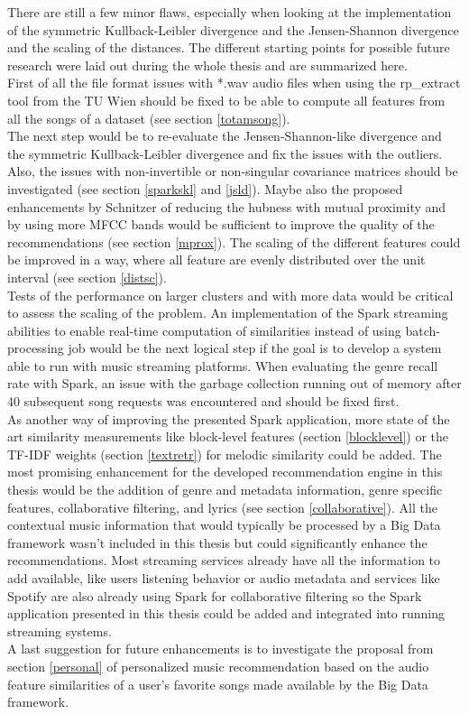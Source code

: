 There are still a few minor flaws, especially when looking at the implementation of the symmetric Kullback-Leibler divergence and the Jensen-Shannon divergence and the scaling of the distances. The different starting points for possible future research were laid out during the whole thesis and are summarized here.\\
First of all the file format issues with *.wav audio files when using the rp\_extract tool from the TU Wien should be fixed to be able to compute all features from all the songs of a dataset (see section \ref{totamsong}).\\
The next step would be to re-evaluate the Jensen-Shannon-like divergence and the symmetric Kullback-Leibler divergence and fix the issues with the outliers. Also, the issues with non-invertible or non-singular covariance matrices should be investigated (see section \ref{sparkskl} and \ref{jsld}). Maybe also the proposed enhancements by Schnitzer \cite{schnitzer1} of reducing the hubness with mutual proximity and by using more MFCC bands would be sufficient to improve the quality of the recommendations (see section \ref{mprox}). The scaling of the different features could be improved in a way, where all feature are evenly distributed over the unit interval (see section \ref{distsc}).\\
Tests of the performance on larger clusters and with more data would be critical to assess the scaling of the problem.
An implementation of the Spark streaming abilities to enable real-time computation of similarities instead of using batch-processing job would be the next logical step if the goal is to develop a system able to run with music streaming platforms. When evaluating the genre recall rate with Spark, an issue with the garbage collection running out of memory after 40 subsequent song requests was encountered and should be fixed first.\\
\noindent As another way of improving the presented Spark application, more state of the art similarity measurements like block-level features (section \ref{blocklevel}) or the TF-IDF weights (section \ref{textretr}) for melodic similarity could be added. The most promising enhancement for the developed recommendation engine in this thesis would be the addition of genre and metadata information, genre specific features, collaborative filtering, and lyrics (see section \ref{collaborative}). All the contextual music information that would typically be processed by a Big Data framework wasn't included in this thesis but could significantly enhance the recommendations. Most streaming services already have all the information to add available, like users listening behavior or audio metadata and services like Spotify are also already using Spark for collaborative filtering so the Spark application presented in this thesis could be added and integrated into running streaming systems.\\
A last suggestion for future enhancements is to investigate the proposal from section \ref{personal} of personalized music recommendation based on the audio feature similarities of a user's favorite songs made available by the Big Data framework.

